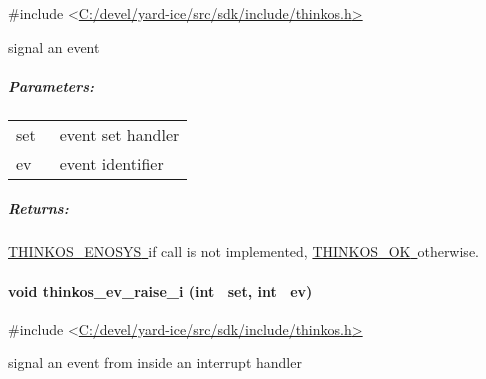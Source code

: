 {{}

{\#include
\textless{}}{\protect\hyperlink{h.pkwqa1}{C:/devel/yard-ice/src/sdk/include/thinkos.h}}{\protect\hyperlink{h.pkwqa1}{\textgreater{}}}

{signal an event }

{}

\subparagraph{\texorpdfstring{{Parameters:}}{Parameters:}}\label{parameters-29}

\protect\hypertarget{t.edc44c26eda9f56c94bb61cc6c572ae53f165af7}{}{}\protect\hypertarget{t.29}{}{}

\begin{longtable}[]{@{}ll@{}}
\toprule
\begin{minipage}[t]{0.47\columnwidth}\raggedright\strut
{set}{~}\strut
\end{minipage} & \begin{minipage}[t]{0.47\columnwidth}\raggedright\strut
{event set handler }\strut
\end{minipage}\tabularnewline
\begin{minipage}[t]{0.47\columnwidth}\raggedright\strut
{ev}{~}\strut
\end{minipage} & \begin{minipage}[t]{0.47\columnwidth}\raggedright\strut
{event identifier }\strut
\end{minipage}\tabularnewline
\bottomrule
\end{longtable}

\subparagraph{\texorpdfstring{{Returns:}}{Returns:}}\label{returns-33}

{\protect\hyperlink{h.3s49zyc}{THINKOS\_ENOSYS}}{\protect\hyperlink{h.3s49zyc}{~}}{if
call is not implemented,
}{\protect\hyperlink{h.2fk6b3p}{THINKOS\_OK}}{\protect\hyperlink{h.2fk6b3p}{~}}{otherwise.
}

\paragraph{\texorpdfstring{{void thinkos\_ev\_raise\_i (int ~set, int
~ev)}}{void thinkos\_ev\_raise\_i (int ~set, int ~ev)}}\label{void-thinkos_ev_raise_i-int-set-int-ev}

{}

{\#include
\textless{}}{\protect\hyperlink{h.pkwqa1}{C:/devel/yard-ice/src/sdk/include/thinkos.h}}{\protect\hyperlink{h.pkwqa1}{\textgreater{}}}

{signal an event from inside an interrupt handler }

{}

}
